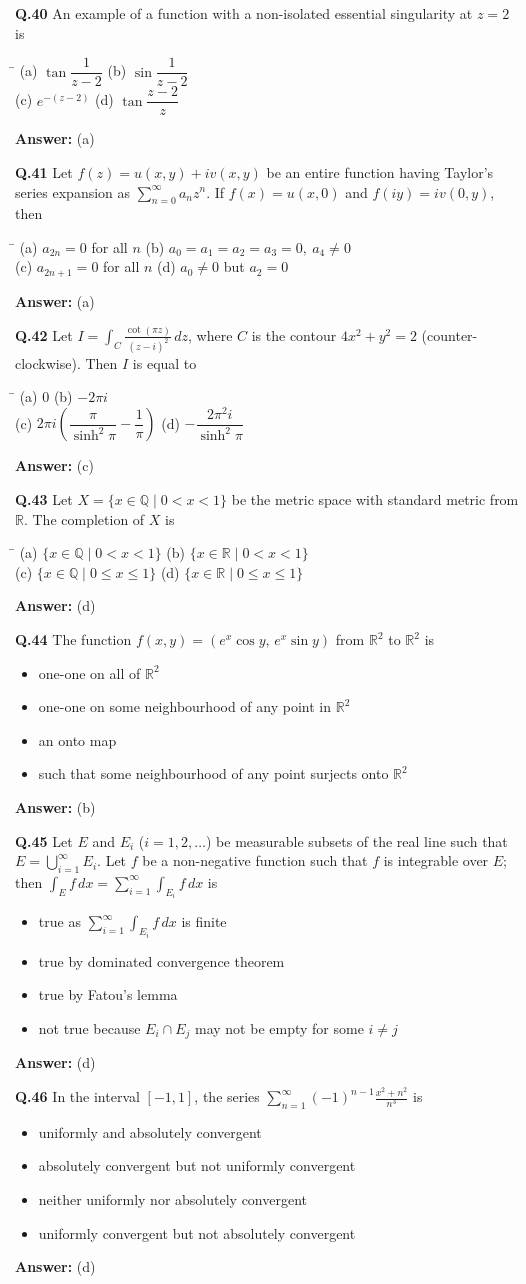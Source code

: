 \documentclass[11pt,a4paper]{article}
\newcommand{\optsfour}[4]{%
  \begin{tabbing}
    \hspace{0.48\linewidth}\=\kill
    (a) #1 \> (b) #2 \\[2pt]
    (c) #3 \> (d) #4
  \end{tabbing}%
}
\newcommand{\optslist}[4]{%
  \begin{itemize}
    \setlength{\itemsep}{2pt}\setlength{\parskip}{0pt}
    \item[(a)] #1
    \item[(b)] #2
    \item[(c)] #3
    \item[(d)] #4
  \end{itemize}%
}
\newcommand{\ans}[1]{\textbf{Answer:} #1\par\medskip}
\begin{document}
\textbf{Q.40} An example of a function with a non-isolated essential singularity at $z = 2$ is
\optsfour{$\tan\dfrac{1}{z - 2}$}{$\sin\dfrac{1}{z - 2}$}{$e^{-(z - 2)}$}{$\tan\dfrac{z - 2}{z}$}
\ans{(a)}

\textbf{Q.41} Let $f(z) = u(x,y) + iv(x,y)$ be an entire function having Taylor's series expansion as $\displaystyle\sum_{n=0}^{\infty} a_n z^n$. If $f(x) = u(x, 0)$ and $f(iy) = i v(0, y)$, then
\optsfour{$a_{2n} = 0$ for all $n$}{$a_0 = a_1 = a_2 = a_3 = 0,\ a_4 \ne 0$}{$a_{2n+1} = 0$ for all $n$}{$a_0 \ne 0$ but $a_2 = 0$}
\ans{(a)}

\textbf{Q.42} Let $I = \displaystyle\int_C \frac{\cot(\pi z)}{(z - i)^2}\,dz$, where $C$ is the contour $4x^2 + y^2 = 2$ (counter-clockwise). Then $I$ is equal to
\optsfour{$0$}{$-2\pi i$}{$2\pi i\!\left(\dfrac{\pi}{\sinh^2\pi} - \dfrac{1}{\pi}\right)$}{$-\dfrac{2\pi^2 i}{\sinh^2\pi}$}
\ans{(c)}

\textbf{Q.43} Let $X = \{x \in \mathbb{Q} \mid 0 < x < 1\}$ be the metric space with standard metric from $\mathbb{R}$. The completion of $X$ is
\optsfour{$\{x \in \mathbb{Q} \mid 0 < x < 1\}$}{$\{x \in \mathbb{R} \mid 0 < x < 1\}$}{$\{x \in \mathbb{Q} \mid 0 \le x \le 1\}$}{$\{x \in \mathbb{R} \mid 0 \le x \le 1\}$}
\ans{(d)}

\textbf{Q.44} The function $f(x,y) = (e^x\cos y,\, e^x\sin y)$ from $\mathbb{R}^2$ to $\mathbb{R}^2$ is
\optslist{one-one on all of $\mathbb{R}^2$}{one-one on some neighbourhood of any point in $\mathbb{R}^2$}{an onto map}{such that some neighbourhood of any point surjects onto $\mathbb{R}^2$}
\ans{(b)}

\textbf{Q.45} Let $E$ and $E_i$ ($i = 1, 2, \dots$) be measurable subsets of the real line such that $E = \displaystyle\bigcup_{i=1}^{\infty} E_i$. Let $f$ be a non-negative function such that $f$ is integrable over $E$; then $\displaystyle\int_E f\,dx = \sum_{i=1}^{\infty} \int_{E_i} f\,dx$ is
\optslist{true as $\displaystyle\sum_{i=1}^{\infty} \int_{E_i} f\,dx$ is finite}{true by dominated convergence theorem}{true by Fatou's lemma}{not true because $E_i \cap E_j$ may not be empty for some $i \ne j$}
\ans{(d)}

\textbf{Q.46} In the interval $[-1, 1]$, the series $\displaystyle\sum_{n=1}^{\infty} (-1)^{n-1} \frac{x^2 + n^2}{n^3}$ is
\optslist{uniformly and absolutely convergent}{absolutely convergent but not uniformly convergent}{neither uniformly nor absolutely convergent}{uniformly convergent but not absolutely convergent}
\ans{(d)}
\end{document}
